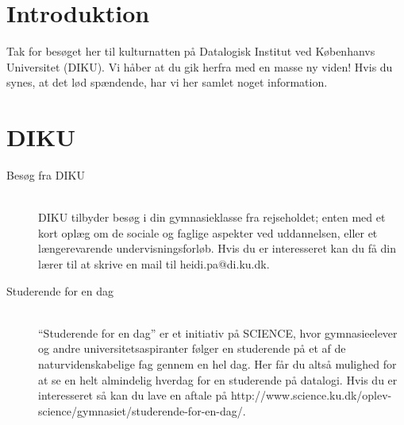 \documentclass[11pt]{article}
\begin{document}
\section{Introduktion}
    Tak for besøget her til kulturnatten på Datalogisk Institut ved Københanvs 
    Universitet (DIKU). Vi håber at du gik herfra med en masse ny viden! 
    Hvis du synes, at det lød spændende, har vi her samlet noget information. 

\section{DIKU}
\begin{description}
    \item[Besøg fra DIKU]~\\
        DIKU tilbyder besøg i din gymnasieklasse fra rejseholdet; enten med et 
        kort oplæg om de sociale og faglige aspekter ved uddannelsen, eller et 
        længerevarende undervisningsforløb. Hvis du er interesseret kan du få 
        din lærer til at skrive en mail til heidi.pa@di.ku.dk.
    \item[Studerende for en dag]~\\
        ``Studerende for en dag'' er et initiativ på SCIENCE, hvor 
        gymnasieelever og andre  universitetsaspiranter følger en studerende på
        et af de naturvidenskabelige fag gennem en hel dag. 
        Her får du altså mulighed for at se en helt almindelig hverdag for 
        en studerende på datalogi. 
        Hvis du er interesseret så kan du lave en aftale på 
        http://www.science.ku.dk/oplev-science/gymnasiet/studerende-for-en-dag/.
\end{description}
\end{document}

